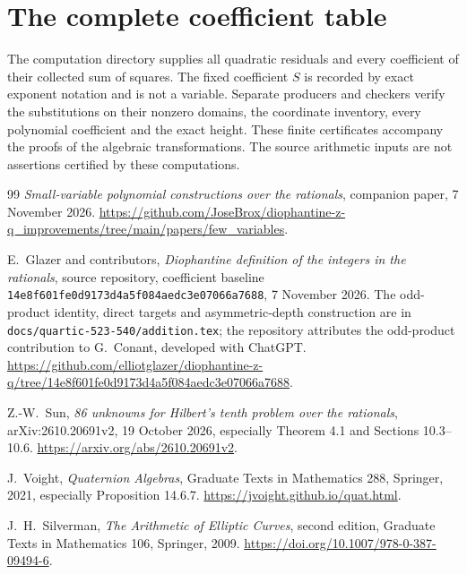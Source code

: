 \documentclass[11pt,a4paper]{article}
\theoremstyle{definition}
\theoremstyle{remark}
\begin{document}
\section{The complete coefficient table}
The computation directory supplies all quadratic residuals and every
coefficient of their collected sum of squares. The fixed coefficient
$S$ is recorded by exact exponent notation and is not a variable.
Separate producers and checkers verify the substitutions on their
nonzero domains, the coordinate inventory, every polynomial
coefficient and the exact height. These finite certificates accompany
the proofs of the algebraic transformations. The source arithmetic
inputs are not assertions certified by these computations.
\clearpage
\begin{thebibliography}{99}
\small
{}
\emph{Small-variable polynomial constructions over the rationals},
companion paper, 7 November 2026.
\url{https://github.com/JoseBrox/diophantine-z-q_improvements/tree/main/papers/few_variables}.

E.~Glazer and contributors, \emph{Diophantine definition of the integers
in the rationals}, source repository, coefficient baseline
\texttt{14e8f601fe0d9173d4a5f084aedc3e07066a7688}, 7 November 2026.
The odd-product identity, direct targets and asymmetric-depth
construction are in \texttt{docs/quartic-523-540/addition.tex}; the
repository attributes the odd-product contribution to G.~Conant,
developed with ChatGPT.
\url{https://github.com/elliotglazer/diophantine-z-q/tree/14e8f601fe0d9173d4a5f084aedc3e07066a7688}.


Z.-W.~Sun, \emph{86 unknowns for Hilbert's tenth problem over
the rationals}, arXiv:2610.20691v2, 19 October 2026,
especially Theorem 4.1 and Sections 10.3--10.6.
\url{https://arxiv.org/abs/2610.20691v2}.


J.~Voight, \emph{Quaternion Algebras}, Graduate Texts in
Mathematics 288, Springer, 2021, especially Proposition 14.6.7.
\url{https://jvoight.github.io/quat.html}.


J.~H.~Silverman, \emph{The Arithmetic of Elliptic Curves},
second edition, Graduate Texts in Mathematics 106, Springer, 2009.
\url{https://doi.org/10.1007/978-0-387-09494-6}.


\end{thebibliography}
\end{document}
